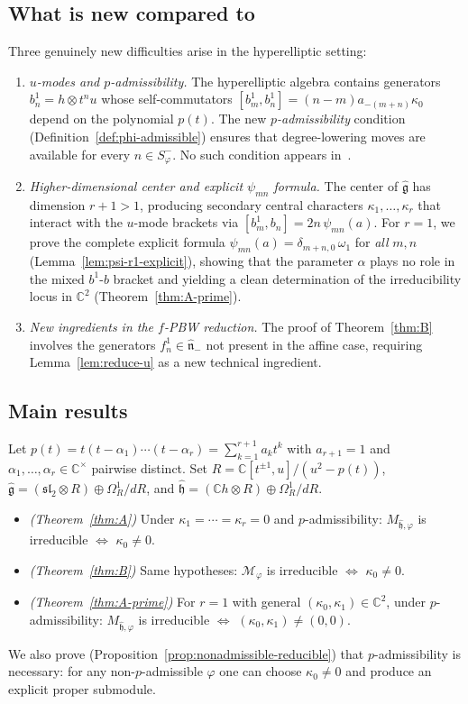 \documentclass{amsart}
\newcommand{\Cx}{\mathbb{C}}
\newcommand{\g}{\mathfrak{g}}
\newcommand{\h}{\mathfrak{h}}
\newcommand{\sltwo}{\mathfrak{sl}_2}
\newcommand{\wh}[1]{\widehat{#1}}
\newcommand{\whg}{\wh{\g}}
\newcommand{\whh}{\wh{\h}}
\theoremstyle{definition}
\theoremstyle{remark}
\numberwithin{equation}{section}
\begin{document}
\subsection*{What is new compared to \cite{Bekkert:2011aa}}
Three genuinely new difficulties arise in the hyperelliptic setting:
\begin{enumerate}[label=(\roman*)]
\item \emph{$u$-modes and $p$-admissibility.}
  The hyperelliptic algebra contains generators $b_n^1=h\otimes t^nu$
  whose self-commutators $[b_m^1,b_n^1]=(n-m)a_{-(m+n)}\kappa_0$ depend
  on the polynomial $p(t)$.  The new \emph{$p$-admissibility} condition
  (Definition~\ref{def:phi-admissible}) ensures that degree-lowering
  moves are available for every $n\in S_\varphi^-$.  No such condition
  appears in~\cite{Bekkert:2011aa}.
\item \emph{Higher-dimensional center and explicit $\psi_{mn}$ formula.}
  The center of $\whg$ has dimension $r+1>1$, producing secondary
  central characters $\kappa_1,\dots,\kappa_r$ that interact with the
  $u$-mode brackets via $[b_m^1,b_n]=2n\,\psi_{mn}(a)$.  For $r=1$,
  we prove the complete explicit formula
  $\psi_{mn}(a)=\delta_{m+n,0}\,\omega_1$ for \emph{all} $m,n$
  (Lemma~\ref{lem:psi-r1-explicit}), showing that the parameter $\alpha$
  plays no role in the mixed $b^1$-$b$ bracket and yielding a clean
  determination of the irreducibility locus in $\Cx^2$
  (Theorem~\ref{thm:A-prime}).
\item \emph{New ingredients in the $f$-PBW reduction.}
  The proof of Theorem~\ref{thm:B} involves the generators
  $f_n^1\in\wh{\mathfrak n}_-$ not present in the affine case, requiring
  Lemma~\ref{lem:reduce-u} as a new technical ingredient.
\end{enumerate}
\subsection*{Main results}
Let $p(t)=t(t-\alpha_1)\cdots(t-\alpha_r)=\sum_{k=1}^{r+1}a_kt^k$
with $a_{r+1}=1$ and $\alpha_1,\dots,\alpha_r\in\Cx^\times$ pairwise
distinct. Set $R=\Cx[t^{\pm1},u]/(u^2-p(t))$,
$\whg=(\sltwo\otimes R)\oplus\Omega_R^1/dR$, and
$\whh=(\Cx h\otimes R)\oplus\Omega_R^1/dR$.
\begin{itemize}[leftmargin=2em]
\item[\textbf{(A)}] \emph{(Theorem~\ref{thm:A})} Under $\kappa_1=\cdots=\kappa_r=0$ and
  $p$-admissibility: $M_{\whh,\varphi}$ is irreducible $\iff$
  $\kappa_0\neq0$.
\item[\textbf{(B)}] \emph{(Theorem~\ref{thm:B})} Same hypotheses: $\mathcal{M}_\varphi$
  is irreducible $\iff$ $\kappa_0\neq0$.
\item[\textbf{(A$'$)}] \emph{(Theorem~\ref{thm:A-prime})} For $r=1$ with general
  $(\kappa_0,\kappa_1)\in\Cx^2$, under $p$-admissibility:
  $M_{\whh,\varphi}$ is irreducible $\iff$ $(\kappa_0,\kappa_1)\neq(0,0)$.
\end{itemize}
We also prove (Proposition~\ref{prop:nonadmissible-reducible}) that
$p$-admissibility is necessary: for any non-$p$-admissible $\varphi$
one can choose $\kappa_0\neq0$ and produce an explicit proper submodule.
\end{document}
